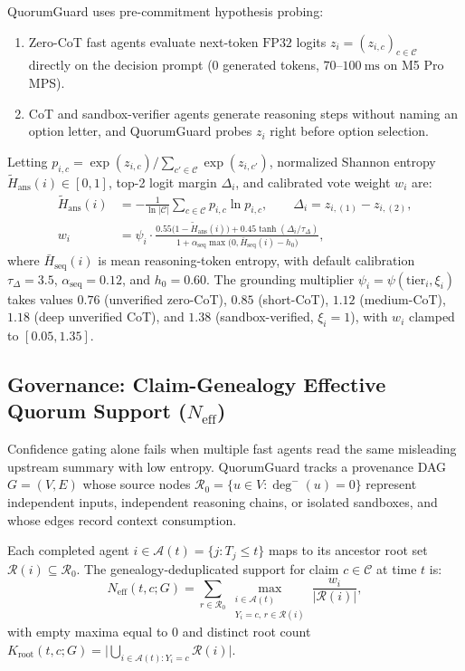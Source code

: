 \documentclass[conference]{IEEEtran}
\def\QG{QuorumGuard}%
\theoremstyle{definition}
\theoremstyle{remark}
\newcommand{\QG}{\textsc{QuorumGuard}}
\newcommand{\Neff}{N_{\mathrm{eff}}}
\newcommand{\Htilde}{\tilde{H}_{\mathrm{ans}}}
\begin{document}
\QG{} uses pre-commitment hypothesis probing:
\begin{enumerate}
  \item Zero-CoT fast agents evaluate next-token $\mathrm{FP32}$ logits $z_i = (z_{i,c})_{c \in \mathcal{C}}$ directly on the decision prompt ($0$ generated tokens, $70$--$100~\mathrm{ms}$ on M5 Pro MPS).
  \item CoT and sandbox-verifier agents generate reasoning steps without naming an option letter, and \QG{} probes $z_i$ right before option selection.
\end{enumerate}
Letting $p_{i,c} = \exp(z_{i,c}) / \sum_{c' \in \mathcal{C}} \exp(z_{i,c'})$, normalized Shannon entropy $\Htilde(i) \in [0, 1]$, top-2 logit margin $\Delta_i$, and calibrated vote weight $w_i$ are:
\begin{align}
  \Htilde(i) &= -\frac{1}{\ln |\mathcal{C}|}\sum_{c \in \mathcal{C}} p_{i,c}\ln p_{i,c}, \qquad \Delta_i = z_{i,(1)} - z_{i,(2)}, \label{eq:entropy_margin} \\
  w_i &= \psi_i \cdot \frac{0.55\big(1 - \Htilde(i)\big) + 0.45\tanh(\Delta_i / \tau_\Delta)}{1 + \alpha_{\mathrm{seq}}\max\big(0, \bar{H}_{\mathrm{seq}}(i) - h_0\big)}, \label{eq:weight}
\end{align}
where $\bar{H}_{\mathrm{seq}}(i)$ is mean reasoning-token entropy, with default calibration $\tau_\Delta = 3.5$, $\alpha_{\mathrm{seq}} = 0.12$, and $h_0 = 0.60$. The grounding multiplier $\psi_i = \psi(\mathrm{tier}_i, \xi_i)$ takes values $0.76$ (unverified zero-CoT), $0.85$ (short-CoT), $1.12$ (medium-CoT), $1.18$ (deep unverified CoT), and $1.38$ (sandbox-verified, $\xi_i = 1$), with $w_i$ clamped to $[0.05, 1.35]$.

\subsection{Governance: Claim-Genealogy Effective Quorum Support (\texorpdfstring{$\Neff$}{Neff})}\label{sec:pillar2}
Confidence gating alone fails when multiple fast agents read the same misleading upstream summary with low entropy. \QG{} tracks a provenance DAG $G = (V, E)$ whose source nodes $\mathcal{R}_0 = \{u \in V : \deg^-(u) = 0\}$ represent independent inputs, independent reasoning chains, or isolated sandboxes, and whose edges record context consumption.

Each completed agent $i \in \mathcal{A}(t) = \{j : T_j \le t\}$ maps to its ancestor root set $\mathcal{R}(i) \subseteq \mathcal{R}_0$. The genealogy-deduplicated support for claim $c \in \mathcal{C}$ at time $t$ is:
\begin{equation}\label{eq:neff}
  \Neff(t, c; G) = \sum_{r \in \mathcal{R}_0} \max_{\substack{i \in \mathcal{A}(t) \\ Y_i = c,\, r \in \mathcal{R}(i)}} \frac{w_i}{|\mathcal{R}(i)|},
\end{equation}
with empty maxima equal to $0$ and distinct root count $K_{\mathrm{root}}(t, c; G) = \big|\bigcup_{i \in \mathcal{A}(t): Y_i = c} \mathcal{R}(i)\big|$.
\end{document}
